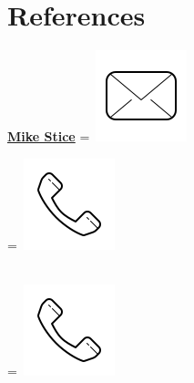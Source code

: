 \documentclass[]{latex/resume}
\begin{document}
\begin{minipage}[t]{0.25\textwidth}
    \sectionsep


\section{References}

    \href{}{\textbf{Mike Stice}} 
    \begingroup
        =\hbox{ \includegraphics[scale=0.1,trim={0 1cm 0cm 0cm}]{latex/icons/mail.png}\hspace{0.1cm}  }
        \parbox{\wd0}{}
    \endgroup
    
    \begingroup
        =\hbox{
        \includegraphics[scale=0.1,trim={0 1.25cm -0.4cm 0cm}]{latex/icons/phone.png}\hspace{0.3cm}
        }
        \parbox{\wd0}{}
    \endgroup \\
    \begingroup
        =\hbox{
        \includegraphics[scale=0.1,trim={0 1.25cm -0.4cm 0cm}]{latex/icons/phone.png}\hspace{0.3cm}
        }
        \parbox{\wd0}{}
    \endgroup \\ 

    \sectionsep
    

\end{minipage}
\end{document}
